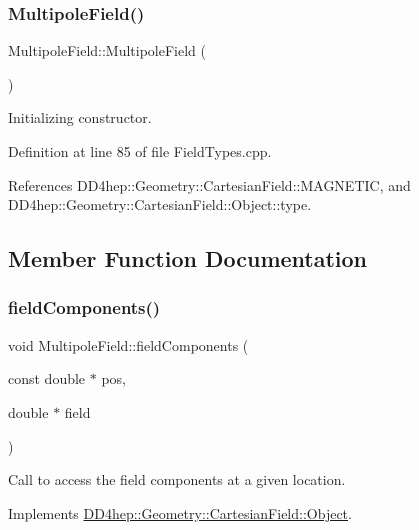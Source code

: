 \subsubsection{\texorpdfstring{Multipole\+Field()}{MultipoleField()}}
{\footnotesize\ttfamily Multipole\+Field\+::\+Multipole\+Field (\begin{DoxyParamCaption}{ }\end{DoxyParamCaption})}



Initializing constructor. 



Definition at line 85 of file Field\+Types.\+cpp.



References D\+D4hep\+::\+Geometry\+::\+Cartesian\+Field\+::\+M\+A\+G\+N\+E\+T\+IC, and D\+D4hep\+::\+Geometry\+::\+Cartesian\+Field\+::\+Object\+::type.



\subsection{Member Function Documentation}
\hypertarget{class_d_d4hep_1_1_geometry_1_1_multipole_field_a06782e6f0fbdfcf53394ee5dda83b052}{}\label{class_d_d4hep_1_1_geometry_1_1_multipole_field_a06782e6f0fbdfcf53394ee5dda83b052} 
\subsubsection{\texorpdfstring{field\+Components()}{fieldComponents()}}
{\footnotesize\ttfamily void Multipole\+Field\+::field\+Components (\begin{DoxyParamCaption}\item[{const double $\ast$}]{pos,  }\item[{double $\ast$}]{field }\end{DoxyParamCaption})\hspace{0.3cm}{\ttfamily [virtual]}}



Call to access the field components at a given location. 



Implements \hyperlink{class_d_d4hep_1_1_geometry_1_1_cartesian_field_1_1_object_ab3fa7f39545c8b0f769ee1ddfd03ed90}{D\+D4hep\+::\+Geometry\+::\+Cartesian\+Field\+::\+Object}.



